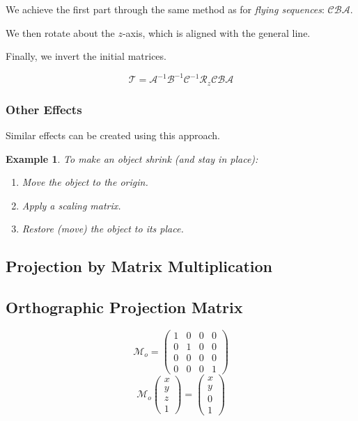 \documentclass[11pt]{article}
\newtheorem{eg}{Example}
\begin{document}
We achieve the first part through the same method as for \textit{flying sequences}: $\mathcal{CBA}$.

We then rotate about the $z$-axis, which is aligned with the general line.

Finally, we invert the initial matrices.

\[
  \mathcal{T} = \mathcal{A}^{-1} \mathcal{B}^{-1} \mathcal{C}^{-1} \mathcal{R}_z \mathcal{CBA}  
\]

\subsubsection{Other Effects}
Similar effects can be created using this approach.
\begin{eg}
  To make an object shrink (and stay in place):
  \begin{enumerate}
    \item Move the object to the origin.
    \item Apply a scaling matrix.
    \item Restore (move) the object to its place.
  \end{enumerate}
\end{eg}

\subsection{Projection by Matrix Multiplication}
\subsection{Orthographic Projection Matrix}
\[
  \mathcal{M}_o =
  \begin{pmatrix}
    1 & 0 & 0 & 0 \\
    0 & 1 & 0 & 0 \\
    0 & 0 & 0 & 0 \\
    0 & 0 & 0 & 1
  \end{pmatrix}
\]
\[
  \mathcal{M}_o
  \begin{pmatrix}
    x \\ y \\ z \\ 1
  \end{pmatrix}
  =
  \begin{pmatrix}
    x \\ y \\ 0 \\ 1
  \end{pmatrix}
\]
\end{document}
